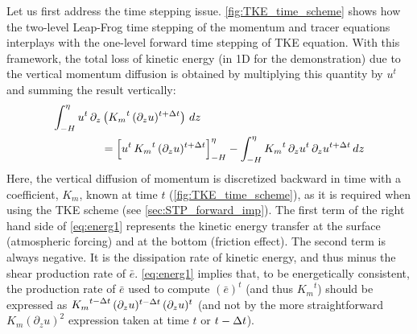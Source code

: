 \documentclass[../tex_main/NEMO_manual]{subfiles}
\begin{document}
Let us first address the time stepping issue. \autoref{fig:TKE_time_scheme} shows 
how the two-level Leap-Frog time stepping of the momentum and tracer equations interplays 
with the one-level forward time stepping of TKE equation. With this framework, the total loss 
of kinetic energy (in 1D for the demonstration) due to the vertical momentum diffusion is 
obtained by multiplying this quantity by $u^t$ and summing the result vertically:   
\begin{equation} \label{eq:energ1}
\begin{split}
\int_{-H}^{\eta}  u^t \,\partial_z &\left( {K_m}^t \,(\partial_z u)^{t+\Delta t}  \right) \,dz   \\
&= \Bigl[  u^t \,{K_m}^t \,(\partial_z u)^{t+\Delta t} \Bigr]_{-H}^{\eta}          
 - \int_{-H}^{\eta}{ {K_m}^t \,\partial_z{u^t} \,\partial_z u^{t+\Delta t} \,dz }
\end{split}
\end{equation}
Here, the vertical diffusion of momentum is discretized backward in time 
with a coefficient, $K_m$, known at time $t$ (\autoref{fig:TKE_time_scheme}), 
as it is required when using the TKE scheme (see \autoref{sec:STP_forward_imp}). 
The first term of the right hand side of \autoref{eq:energ1} represents the kinetic energy 
transfer at the surface (atmospheric forcing) and at the bottom (friction effect). 
The second term is always negative. It is the dissipation rate of kinetic energy, 
and thus minus the shear production rate of $\bar{e}$. \autoref{eq:energ1} 
implies that, to be energetically consistent, the production rate of $\bar{e}$ 
used to compute $(\bar{e})^t$ (and thus ${K_m}^t$) should be expressed as 
${K_m}^{t-\Delta t}\,(\partial_z u)^{t-\Delta t} \,(\partial_z u)^t$ (and not by the more straightforward 
$K_m \left( \partial_z u \right)^2$ expression taken at time $t$ or $t-\Delta t$).
\end{document}
